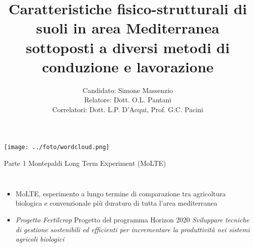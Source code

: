 \documentclass[xcolor={usenames, table, x11names}, final, 10pt]{beamer}
\title[25 anni di conduzione biologica in area Mediterranea: uno
studio di fisica del suolo] %
{ Caratteristiche fisico-strutturali di suoli in area Mediterranea
  sottoposti a diversi metodi di conduzione e lavorazione}
\author[Simone Massenzio]{ 
  Candidato: Simone Massenzio \\
  Relatore: Dott. O.L. Pantani\\
  \vspace{0.1cm}
  Correlatori:
  Dott. L.P. D'Acqui, Prof. G.C. Pacini}
\institute[] { \emph{Dipartimento di Scienze della Produzioni Animali e
    dell'Ambiente\\
    Universit\`a degli Studi di Firenze - UniFI\\}
  
}
\date{\displaydate{date}}
\begin{document}
{\1
  \begin{frame}[noframenumbering]%
    \titlepage
  \end{frame}}




\begin{frame}
  \vspace{2cm}
  
  \centering
  \texttt{[image: ../foto/wordcloud.png]}
  
\end{frame}

\begin{frame}{Parte 1 \small{Montepaldi Long Term Experiment (MoLTE)}}
  \begin{columns}
    
    \begin{itemize}[<+->]
      \item MoLTE, esperimento a lungo termine di comparazione tra
        agricoltura biologica e convenzionale più duraturo di tutta
        l'area mediterranea
      \item \emph{Progetto Fertilcrop} Progetto del programma Horizon
        2020
     \emph{Sviluppare tecniche di gestione sostenibili ed efficienti per
    incrementare la produttività nei sistemi agricoli biologici}
    \end{itemize}

  \end{columns}
\end{frame}
\end{document}
